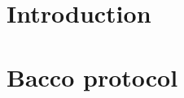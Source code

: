 \thispagestyle{empty} %
\cleardoublepage

\thispagestyle{empty}

\clearpage{\pagestyle{plain}\cleardoublepage}


\printunsrtglossaries

\clearpage{\pagestyle{plain}\cleardoublepage}
\tableofcontents

\clearpage{\pagestyle{plain}\cleardoublepage}

\chapter{Introduction}
\label{chapter:introduction}


%

%

\chapter{Bacco protocol}
\label{chapter:protocol}


%

%

%
\nocite{*}
\printbibliography





